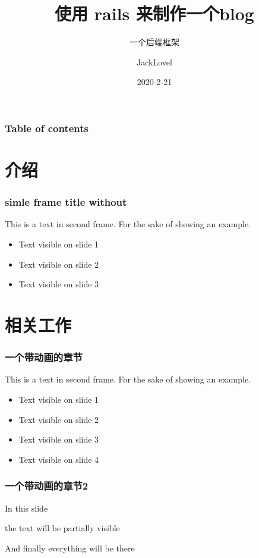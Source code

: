\documentclass[12pt]{beamer}
\title{使用 rails 来制作一个blog}
\subtitle{一个后端框架}
\author{JackLovel}
\date{2020-2-21}
\begin{document}
	
\frame{\titlepage}
\begin{frame}
\frametitle{Table of contents}
\tableofcontents
\end{frame}

\section{介绍}

\begin{frame}
\frametitle{simle frame title without}

This is a text in second frame. For the sake of showing an example.

\begin{itemize}
\item Text visible on slide 1 
\item Text visible on slide 2
\item Text visible on slide 3 
\end{itemize}
\end{frame}

\section{相关工作}
\begin{frame}
	\frametitle{一个带动画的章节}
	
	This is a text in second frame. For the sake of showing an example.
	
	\begin{itemize}
		\item<1-> Text visible on slide 1 
		\item<2-> Text visible on slide 2
		\item<3-> Text visible on slide 3 
	    \item<4-> Text visible on slide 4
	\end{itemize}
\end{frame}


\begin{frame}
\frametitle{一个带动画的章节2}
In this slide\pause

the text will be partially visible\pause

And finally everything will be there 
\end{frame}
\end{document}
